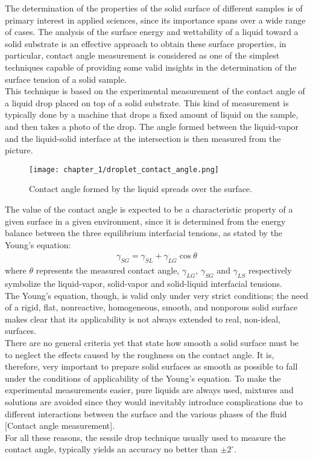 The determination of the properties of the solid surface of different samples is of primary interest in applied sciences, since its importance spans over a wide range of cases. The analysis of the surface energy and wettability of a liquid toward a solid substrate is an effective approach to obtain these surface properties, in particular, contact angle measurement is considered as one of the simplest techniques capable of providing some valid insights in the determination of the surface tension of a solid sample.
\\
This technique is based on the experimental measurement of the contact angle of a liquid drop placed on top of a solid substrate. This kind of measurement is typically done by a machine that drops a fixed amount of liquid on the sample, and then takes a photo of the drop. The angle formed between the liquid-vapor and the liquid-solid interface at the intersection is then measured from the picture.
\begin{figure}[H]
    \centering
    \texttt{[image: chapter\_1/droplet\_contact\_angle.png]}
    \vspace*{10pt}
    \caption{Contact angle formed by the liquid spreads over the surface. }
    \label{fig:contact_angle_example}
\end{figure}
The value of the contact angle is expected to be a characteristic property of a given surface in a given environment, since it is determined from the energy balance between the three equilibrium interfacial tensions, as stated by the Young’s equation:
\begin{align}
    \gamma_{SG} = \gamma_{SL} + \gamma_{LG} \cos\theta \label{eq:young_equation}
\end{align}
where $\theta$ represents the measured contact angle, $\gamma_{LG}$, $\gamma_{SG}$ and $\gamma_{LS}$ respectively symbolize the liquid-vapor, solid-vapor and solid-liquid interfacial tensions.
\\
The Young’s equation, though, is valid only under very strict conditions; the need of a rigid, flat, nonreactive, homogeneous, smooth, and nonporous solid surface makes clear that its applicability is not always extended to real, non-ideal, surfaces.
\\
There are no general criteria yet that state how smooth a solid surface must be to neglect the effects caused by the roughness on the contact angle. It is, therefore, very important to prepare solid surfaces as smooth as possible to fall under the conditions of applicability of the Young’s equation. To make the experimental measurements easier, pure liquids are always used, mixtures and solutions are avoided since they would inevitably introduce complications due to different interactions between the surface and the various phases of the fluid [Contact angle measurement].
\\
For all these reasons, the sessile drop technique usually used to measure the contact angle, typically yields an accuracy no better than $\pm 2^\circ$.


